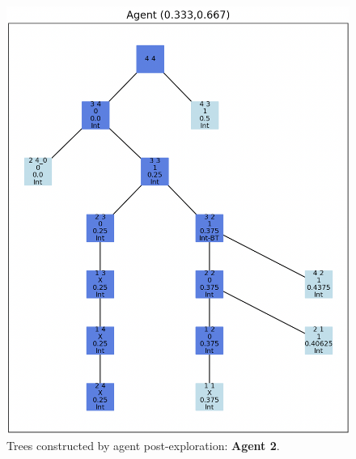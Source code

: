 \begin{figure}[H]
\centering
\includegraphics[width=1\textwidth]{Cap3/agent_2.png}
\caption{Trees constructed by agent post-exploration: \textbf{Agent 2}.}
\label{fig_agent_2_tree}
\end{figure}

